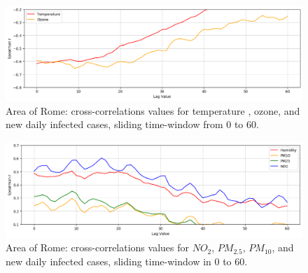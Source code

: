 \documentclass[review]{elsarticle}
\begin{document}
\begin{figure}[htp] 	\centering 	\includegraphics[width=1\linewidth]{img/corr_temp_rome.png} 	\caption{Area of Rome: cross-correlations values for temperature 
, ozone,
 and new daily infected cases, sliding time-window from $0$ to $60$.} 	\label{fig:corr_rome} \end{figure} 
 \begin{figure}[htp]	\centering	\includegraphics[width=1\linewidth]{img/corr_pm_rome.png}	\caption{Area of Rome: cross-correlations values for $NO_{2}$, $PM_{2.5}$, $PM_{10}$, and new daily infected cases, sliding time-window in $0$ to $60$.}	\label{fig:corr_pm_rome} \end{figure}
\end{document}
